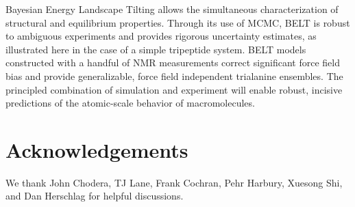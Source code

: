 \documentclass[11pt,titlepage]{article}
\begin{document}
Bayesian Energy Landscape Tilting allows the simultaneous characterization of structural and equilibrium properties.  Through its use of MCMC, BELT is robust to ambiguous experiments and provides rigorous uncertainty estimates, as illustrated here in the case of a simple tripeptide system.  BELT models constructed with a handful of NMR measurements correct significant force field bias and provide generalizable, force field independent trialanine ensembles.  The principled combination of simulation and experiment will enable robust, incisive predictions of the atomic-scale behavior of macromolecules.  


\section*{Acknowledgements}

We thank John Chodera, TJ Lane, Frank Cochran, Pehr Harbury, Xuesong Shi, and Dan Herschlag for helpful discussions.  


\end{document}
